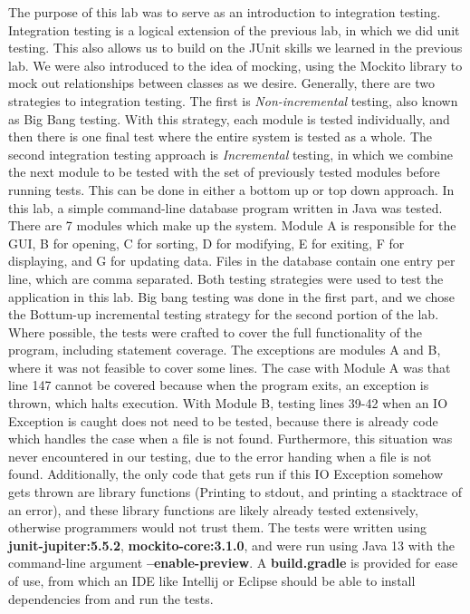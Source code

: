 The purpose of this lab was to serve as an introduction to integration testing.
Integration testing is a logical extension of the previous lab, in which we did
unit testing. This also allows us to build on the JUnit skills we learned in
the previous lab. We were also introduced to the idea of mocking, using the
Mockito library to mock out relationships between classes as we desire.
Generally, there are two strategies to integration testing. The first is
\textit{Non-incremental} testing, also known as Big Bang testing. With this
strategy, each module is tested individually, and then there is one final test
where the entire system is tested as a whole. The second integration testing
approach is \textit{Incremental} testing, in which we combine the next module
to be tested with the set of previously tested modules before running tests.
This can be done in either a bottom up or top down approach. In this lab, a
simple command-line database program written in Java was tested. There are 7
modules which make up the system.  Module A is responsible for the GUI, B for
opening, C for sorting, D for modifying, E for exiting, F for displaying, and G
for updating data. Files in the database contain one entry per line, which are
comma separated. Both testing strategies were used to test the application in
this lab. Big bang testing was done in the first part, and we chose the
Bottum-up incremental testing strategy for the second portion of the lab. Where
possible, the tests were crafted to cover the full functionality of the
program, including statement coverage. The exceptions are modules A and B,
where it was not feasible to cover some lines.  The case with Module A was that
line 147 cannot be covered because when the program exits, an exception is
thrown, which halts execution. With Module B, testing lines 39-42 when an IO
Exception is caught does not need to be tested, because there is already code
which handles the case when a file is not found.  Furthermore, this situation
was never encountered in our testing, due to the error handing when a file is
not found. Additionally, the only code that gets run if this IO Exception
somehow gets thrown are library functions (Printing to stdout, and printing a
stacktrace of an error), and these library functions are likely already tested
extensively, otherwise programmers would not trust them.  The tests were
written using \textbf{junit-jupiter:5.5.2}, \textbf{mockito-core:3.1.0}, and
were run using Java 13 with the command-line argument
\textbf{--enable-preview}. A \textbf{build.gradle} is provided for ease of use,
from which an IDE like Intellij or Eclipse should be able to install
dependencies from and run the tests.
